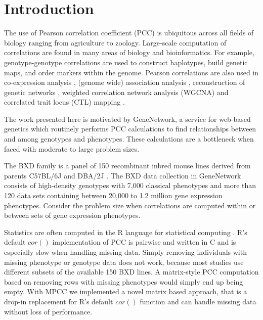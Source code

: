 \documentclass{bioinfo}
\begin{document}
\maketitle


\section{Introduction}

The use of Pearson correlation coefficient (PCC) is ubiquitous across all 
fields of biology ranging from agriculture to zoology. Large-scale 
computation of correlations are found in many areas of biology and 
bioinformatics.  For example, genotype-genotype correlations are 
used to construct haplotypes, build genetic maps, and order markers 
within the genome. Pearson correlations are also used in 
co-expression analysis \citep{Tesson:2010}, (genome wide) 
association analysis \citep{Cichonska:2016}, reconstruction of genetic
networks \citep{Fukushima:2013}, weighted correlation network analysis
(WGCNA) \citep{Horvath:2008} and correlated trait locus (CTL)
mapping \citep{Arends2016a}.

\enlargethispage{12pt}

The work presented here is motivated by GeneNetwork, a service for
web-based genetics \citep{Sloan2016} which routinely performs PCC 
calculations to find relationships between and among genotypes and 
phenotypes. These calculations are a bottleneck when faced with 
moderate to large problem sizes.

The BXD family is a panel of 150 recombinant inbred mouse lines
derived from parents C57BL/6J and DBA/2J \citep{Ashbrook:2019}. The
BXD data collection in GeneNetwork consists of high-density genotypes
with 7,000 classical phenotypes and more than 120 data sets containing
between 20,000 to 1.2 million gene expression phenotypes. Consider 
the problem size when correlations are computed within or between sets 
of gene expression phenotypes. 

Statistics are often computed in the R language for statistical computing 
\citep{R:2005}. R's default $cor()$ implementation of PCC is pairwise 
and written in C and is especially slow when handling missing data. 
Simply removing individuals with missing phenotype or genotype data does 
not work, because most studies use different subsets of the available 
150 BXD lines. A matrix-style PCC computation based on removing rows 
with missing phenotypes would simply end up being empty. With MPCC we 
implemented a novel matrix based approach, that is a drop-in replacement 
for R's default $cor()$ function and can handle missing data without 
loss of performance.
\end{document}
